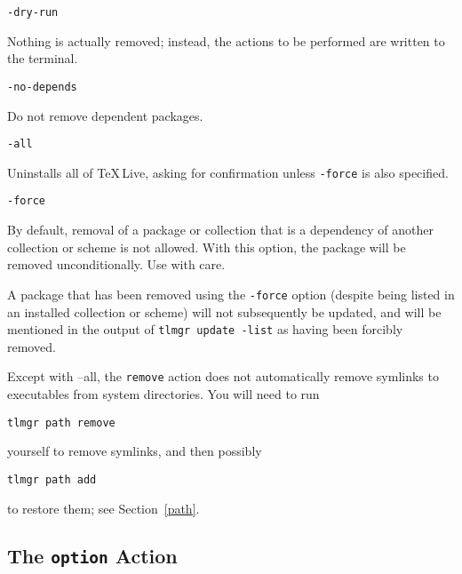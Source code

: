 \documentclass[11pt]{article}
\begin{document}
\begin{description}

\item\texttt{-dry-run}\par 

Nothing is actually removed; instead, the actions to be
performed are written to the terminal.

\item\texttt{-no-depends}\par 

Do not remove dependent packages.

\item\texttt{-all}\par 

Uninstalls all of \TeX\,Live, asking for confirmation unless
\texttt{-force} is also specified.

\item\texttt{-force}\par

By default, removal of a package or collection that is a dependency of another collection or
scheme is not allowed. With this option, the package will be removed unconditionally. Use
with care.

A package that has been removed using the \texttt{-force} option (despite being listed in an
installed collection or scheme) will not subsequently be updated, and will be mentioned 
in the output of \texttt{tlmgr update -list}
as having been
forcibly
removed.


\end{description}

\begin{sloppypar}
\par\noindent
Except with --all, the \texttt{remove} action does not automatically remove symlinks to executables
from system directories. You will need to run 
\end{sloppypar}
\begin{list}{}{}
\item \texttt{tlmgr path remove} 
\end{list}
yourself to remove symlinks,
and then possibly
\begin{list}{}{}
\item \texttt{tlmgr path add} 
\end{list}
to restore them;
see Section~\ref{path}.

\clearpage

\subsection{The {\tt option} Action}
\label{option}
\end{document}
